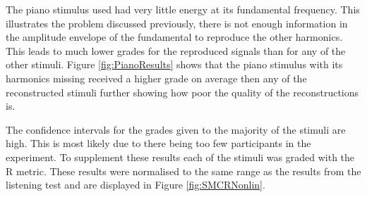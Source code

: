 	The piano stimulus used had very little energy at its fundamental frequency. This illustrates the problem discussed
	previously, there is not enough information in the amplitude envelope of the fundamental to reproduce the other
	harmonics. This leads to much lower grades for the reproduced signals than for any of the other stimuli. Figure
	\ref{fig:PianoResults} shows that the piano stimulus with its harmonics missing received a higher grade on average
	then any of the reconstructed stimuli further showing how poor the quality of the reconstructions is.

	The confidence intervals for the grades given to the majority of the stimuli are high. This is most likely due to
	there being too few participants in the experiment. To supplement these results each of the stimuli was graded with
	the R metric. These results were normalised to the same range as the results from the listening test and
	are displayed in Figure \ref{fig:SMCRNonlin}.


